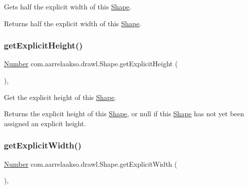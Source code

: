 Gets half the explicit width of this \hyperlink{classcom_1_1aarrelaakso_1_1drawl_1_1_shape}{Shape}. 

\begin{DoxyReturn}{Returns}
half the explicit width of this \hyperlink{classcom_1_1aarrelaakso_1_1drawl_1_1_shape}{Shape}. 
\end{DoxyReturn}
\mbox{\label{classcom_1_1aarrelaakso_1_1drawl_1_1_shape_a48917787cedbfd447cd37edbb59a1145}} 
\subsubsection{\texorpdfstring{get\+Explicit\+Height()}{getExplicitHeight()}}
{\footnotesize\ttfamily \hyperlink{interfacecom_1_1aarrelaakso_1_1drawl_1_1_number}{Number} com.\+aarrelaakso.\+drawl.\+Shape.\+get\+Explicit\+Height (\begin{DoxyParamCaption}{ }\end{DoxyParamCaption})\hspace{0.3cm}{\ttfamily [protected]}, {\ttfamily [inherited]}}



Get the explicit height of this \hyperlink{classcom_1_1aarrelaakso_1_1drawl_1_1_shape}{Shape}. 

\begin{DoxyReturn}{Returns}
the explicit height of this \hyperlink{classcom_1_1aarrelaakso_1_1drawl_1_1_shape}{Shape}, or {\ttfamily null} if this \hyperlink{classcom_1_1aarrelaakso_1_1drawl_1_1_shape}{Shape} has not yet been assigned an explicit height. 
\end{DoxyReturn}
\mbox{\label{classcom_1_1aarrelaakso_1_1drawl_1_1_shape_aca08f18bbe102a5cf6a77cb746d42875}} 
\subsubsection{\texorpdfstring{get\+Explicit\+Width()}{getExplicitWidth()}}
{\footnotesize\ttfamily \hyperlink{interfacecom_1_1aarrelaakso_1_1drawl_1_1_number}{Number} com.\+aarrelaakso.\+drawl.\+Shape.\+get\+Explicit\+Width (\begin{DoxyParamCaption}{ }\end{DoxyParamCaption})\hspace{0.3cm}{\ttfamily [protected]}, {\ttfamily [inherited]}}



